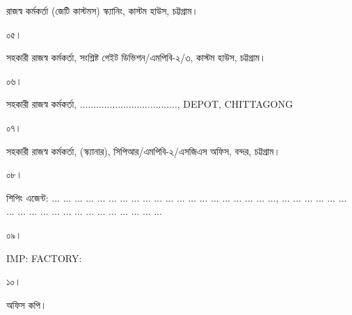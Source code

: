 \documentclass[12pt]{article}
\newcommand{\rdepo}{...................................., DEPOT, CHITTAGONG}
\newcommand{\impn}{\cbl}
\newcommand{\impadd}{\cbla}
\newcommand{\san}{... ... ... ... ... ... ... ... ... ... ... ... ... ... ... ... ... ... ... ...}
\newcommand{\sad}{... ... ... ... ... ... ... ... ... ... ... ... ... ... ... ... ... ... ... ...}
\begin{document}
\begin{minipage}[t]{0.94\linewidth}
\scriptsize{রাজস্ব কর্মকর্তা (জেটি কাস্টমস) স্ক্যানিং, কাস্টম হাউস, চট্টগ্রাম।}
\end{minipage}
\begin{minipage}[t]{0.06\linewidth}
\scriptsize{০৫।}
\end{minipage}
\begin{minipage}[t]{0.94\linewidth}
\scriptsize{সহকারী রাজস্ব কর্মকর্তা, সংশ্লিষ্ট গেইট ডিভিশন/এমপিবি-২/৩, কাস্টম হাউস, চট্টগ্রাম।}
\end{minipage}
\begin{minipage}[t]{0.06\linewidth}
\scriptsize{০৬।}
\end{minipage}
\begin{minipage}[t]{0.94\linewidth}
\scriptsize{সহকারী রাজস্ব কর্মকর্তা, {\rdepo}}
\end{minipage}
\begin{minipage}[t]{0.06\linewidth}
\scriptsize{০৭।}
\end{minipage}
\begin{minipage}[t]{0.94\linewidth}
\scriptsize{সহকারী রাজস্ব কর্মকর্তা, (স্ক্যানার), সিপিআর/এমপিবি-২/এসজিএস অফিস, বন্দর, চট্টগ্রাম।}
\end{minipage}
\begin{minipage}[t]{0.06\linewidth}
\scriptsize{০৮।}
\end{minipage}
\begin{minipage}[t]{0.94\linewidth}
\scriptsize{শিপিং এজেন্ট:
{\san}, {\sad}}
\end{minipage}
\begin{minipage}[t]{0.06\linewidth}
\scriptsize{০৯।}
\end{minipage}
\begin{minipage}[t]{0.94\linewidth}
\scriptsize{IMP: {\impn}
FACTORY:{\impadd}}
\end{minipage}
\begin{minipage}[t]{0.06\linewidth}
\scriptsize{১০।}
\end{minipage}
\begin{minipage}[t]{0.94\linewidth}
\scriptsize{অফিস কপি।}
\\
\\
\\
\\
\\
\\
\end{minipage}
\begin{minipage}[t]{0.60\linewidth}
\hspace{1em}
\end{minipage}
\end{document}
